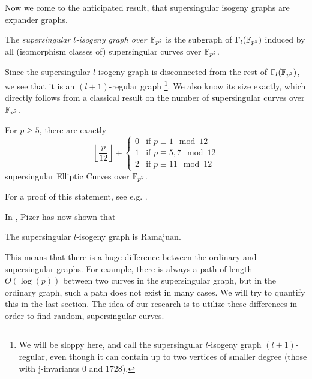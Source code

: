 Now we come to the anticipated result, that supersingular isogeny graphs are expander graphs.
\begin{definition}
    The \emph{supersingular $l$-isogeny graph over $\mathbb{F}_{p^2}$} is the subgraph of $\Gamma_l(\mathbb{F}_{p^2})$ induced by all (isomorphism classes of) supersingular curves over $\mathbb{F}_{p^2}$.
\end{definition}
Since the supersingular $l$-isogeny graph is disconnected from the rest of $\Gamma_l(\mathbb{F}_{p^2})$, we see that it is an $(l + 1)$-regular graph
\footnote{We will be sloppy here, and call the supersingular $l$-isogeny graph $(l + 1)$-regular, even though it can contain up to two vertices of smaller degree (those with j-invariants $0$ and $1728$).}.
We also know its size exactly, which directly follows from a classical result on the number of supersingular curves over $\mathbb{F}_{p^2}$.
\begin{prop}
    For $p \geq 5$, there are exactly
    \begin{equation*}
        \left\lfloor \frac p {12} \right\rfloor + \begin{cases}
            0 & \text{if $p \equiv 1 \mod 12$} \\
            1 & \text{if $p \equiv 5, 7 \mod 12$} \\
            2 & \text{if $p \equiv 11 \mod 12$}
        \end{cases}
    \end{equation*}
    supersingular Elliptic Curves over $\mathbb{F}_{p^2}$.
\end{prop}
For a proof of this statement, see e.g. \cite[Thm~V.4.1]{arithmetic_elliptic_curves}.

In \cite{supersingular_graphs_ramajuan}, Pizer has now shown that
\begin{theorem}
    \label{prop:supersingular_graph_ramajuan}
    The supersingular $l$-isogeny graph is Ramajuan.
\end{theorem}
This means that there is a huge difference between the ordinary and supersingular graphs.
For example, there is always a path of length $O(\log(p))$ between two curves in the supersingular graph, but in the ordinary graph, such a path does not exist in many cases.
We will try to quantify this in the last section.
The idea of our research is to utilize these differences in order to find random, supersingular curves.

